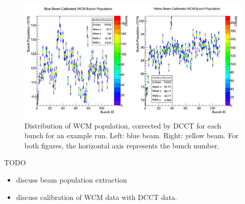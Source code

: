 \begin{figure}
  \centering
  \includegraphics[width=\linewidth]{./figures/359711_bunch_population.png}
  \caption{
    Distribution of WCM population, corrected by DCCT for each bunch for an
    example run. Left: blue beam. Right: yellow beam. For both figures, the
    horizontal axis represents the bunch number.
  }
  \label{fig:bunch_population_example}
\end{figure}

\edithere{}
TODO
\begin{itemize}
    \item discuss beam population extraction
    \item discuss calibration of WCM data with DCCT data.
\end{itemize}
